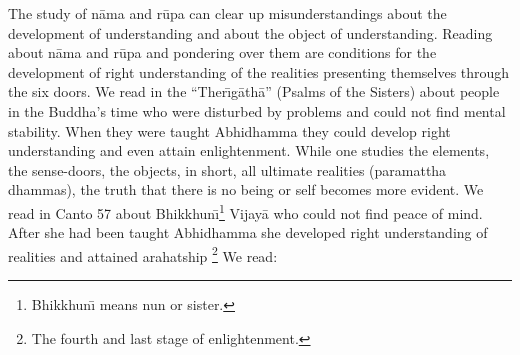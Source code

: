 \documentclass{book}
\begin{document}
The study of n{\=a}ma and r\=upa can clear up misunderstandings about
the development of understanding and about the object of understanding.
Reading about n{\=a}ma and r\=upa and pondering over them are
conditions for the development of right understanding of the realities
presenting themselves thro\-ugh the six doors.
We read in the ``Ther\=\i g{\=a}th{\=a}'' (Psalms of the Sisters) about
people in the Buddha's time who were disturbed by problems and could
not find mental stability. When they were taught Abhidhamma they could
develop right understanding and even attain enlightenment. While one
studies the elements, the sense-doors, the objects, in short, all
ultimate realities (paramattha dhammas), the truth that there is no
being or self becomes more evident. We read in Canto 57 about
Bhikkhun\=\i{}\footnote{Bhikkhun\=\i{}  means nun or sister.} Vijay{\=a}
who could not find peace of mind. After she had been taught Abhidhamma
she developed right understanding of realities and attained arahatship
\footnote{The fourth and last stage of enlightenment.} We read:
\end{document}
